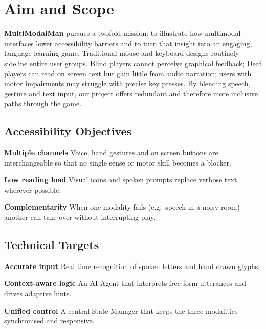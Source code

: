 \section{Aim and Scope}

\noindent
\textbf{MultiModalMan} pursues a twofold mission: to illustrate how multimodal interfaces lower accessibility barriers and to turn that insight into an engaging, language learning game.  Traditional mouse and keyboard designs routinely sideline entire user groups.  Blind players cannot perceive graphical feedback; Deaf players can read on screen text but gain little from audio narration; users with motor impairments may struggle with precise key presses.  By blending speech, gesture and text input, our project offers redundant and therefore more inclusive paths through the game.

\subsection*{Accessibility Objectives}
\begin{description}[leftmargin=1.2em,style=nextline]
  \item\textbf{Multiple channels} Voice, hand gestures and on screen buttons are interchangeable so that no single sense or motor skill becomes a blocker.
  \item\textbf{Low reading load} Visual icons and spoken prompts replace verbose text wherever possible.
  \item\textbf{Complementarity} When one modality fails (e.g.\ speech in a noisy room) another can take over without interrupting play.
\end{description}

\subsection*{Technical Targets}
\begin{description}[leftmargin=1.2em,style=nextline]
  \item\textbf{Accurate input} Real time recognition of spoken letters and hand drawn glyphs.
  \item\textbf{Context-aware logic} An AI Agent that interprets free form utterances and drives adaptive hints.
  \item\textbf{Unified control} A central State Manager that keeps the three modalities synchronised and responsive.
\end{description}
